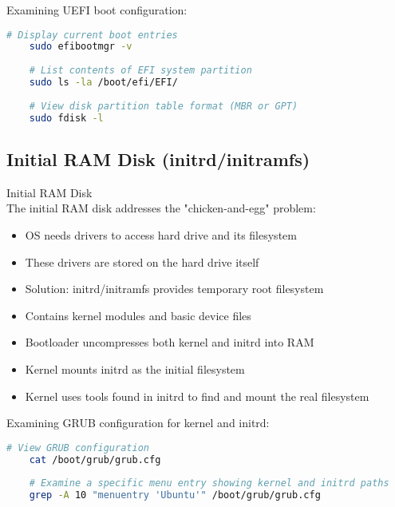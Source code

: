 \begin{example}
    Examining UEFI boot configuration:
    \begin{lstlisting}[language=bash, style=basesmol]
    # Display current boot entries
    sudo efibootmgr -v
    
    # List contents of EFI system partition
    sudo ls -la /boot/efi/EFI/
    
    # View disk partition table format (MBR or GPT)
    sudo fdisk -l
    \end{lstlisting}
\end{example}

\subsection{Initial RAM Disk (initrd/initramfs)}

\begin{definition}{Initial RAM Disk}\\
    The initial RAM disk addresses the "chicken-and-egg" problem:
    \begin{itemize}
        \item OS needs drivers to access hard drive and its filesystem
        \item These drivers are stored on the hard drive itself
        \item Solution: initrd/initramfs provides temporary root filesystem
        \item Contains kernel modules and basic device files
        \item Bootloader uncompresses both kernel and initrd into RAM
        \item Kernel mounts initrd as the initial filesystem
        \item Kernel uses tools found in initrd to find and mount the real filesystem
    \end{itemize}
\end{definition}

\begin{example}
    Examining GRUB configuration for kernel and initrd:
    \begin{lstlisting}[language=bash, style=basesmol]
    # View GRUB configuration
    cat /boot/grub/grub.cfg
    
    # Examine a specific menu entry showing kernel and initrd paths
    grep -A 10 "menuentry 'Ubuntu'" /boot/grub/grub.cfg
    \end{lstlisting}
\end{example}


